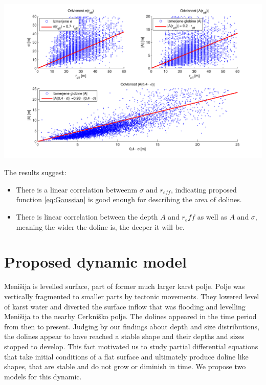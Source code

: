 \documentclass[a0,portrait]{a0poster}
\begin{document}
\begin{multicols}{2}
\begin{center}
\includegraphics[width=\linewidth]{menisija-A-sigma-reff.pdf}
\label{fig:vrtace-fit}
\end{center}

The results suggest:
\begin{itemize}
	\item There is a linear correlation betweenm $\sigma$ and $r_{eff}$, indicating proposed function \ref{eq:Gaussian} is good enough for describing the area of dolines.
	\item There is linear correlation between the depth $A$ and $r_eff$ as well as $A$ and $\sigma$, meaning the wider the doline is, the deeper it will be.
\end{itemize}



\section*{Proposed dynamic model}

Menišija is levelled surface, part of former much larger karst polje. Polje was vertically fragmented to smaller parts by tectonic movements. They lowered level of karst water and diverted the surface inflow that was flooding and levelling Menišija to the nearby Cerkniško polje. The dolines appeared in the time period from then to present. Judging by our findings about depth and size distributions, the dolines appear to have reached a stable shape and their depths and sizes stopped to develop.
This fact motivated us to study partial differential equations that take initial conditions of a flat surface and ultimately produce doline like shapes, that are stable and do not grow or diminish in time. We propose two models for this dynamic.


\end{multicols}
\end{document}
